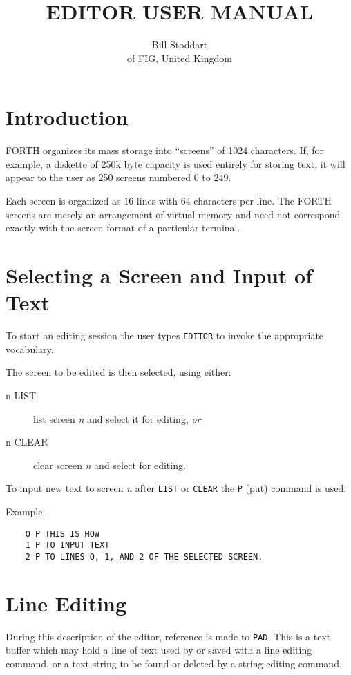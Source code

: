 \documentclass{article}
\title{EDITOR USER MANUAL}
\author{Bill Stoddart\\of FIG, United Kingdom} %
\date{} %
\newcommand{\n}{\textit{n}}
\begin{document}
\maketitle
\begin{multicols*}{2}[]
	\setlength{\parskip}{.5em}
	\setlength\parindent{0pt}
	\section{Introduction}
	FORTH organizes its mass storage into ``screens'' of 1024 characters.
	If, for example, a diskette of 250k byte capacity is used entirely
	for storing text, it will appear to the user as 250 screens
	numbered 0 to 249.

	Each screen is organized as 16 lines with 64 characters per line.
	The FORTH screens are merely an arrangement of virtual memory and
	need not correspond exactly with the screen format of a particular
	terminal.

	\section{Selecting a Screen and Input of Text}

	To start an editing session the user types \verb|EDITOR| to invoke the
	appropriate vocabulary.

	The screen to be edited is then selected, using either:
	\begin{description}
		\item[n LIST]
			list screen \n{} and select it for editing, \textit{or}
		\item[n CLEAR]
			clear screen \n{} and select for editing.
	\end{description}

	To input new text to screen \n{} after \verb|LIST| or \verb|CLEAR|
	the \verb|P| (put) command is used.

	Example:
	\begin{verbatim}
	O P THIS IS HOW
	1 P TO INPUT TEXT
	2 P TO LINES O, 1, AND 2 OF THE SELECTED SCREEN.
	\end{verbatim}

	\section{Line Editing}

	During this description of the editor, reference is made to \verb|PAD|.
	This is a text buffer which may hold a line of text used by or
	saved with a line editing command, or a text string to be found or
	deleted by a string editing command.


\end{multicols*}
\end{document}
